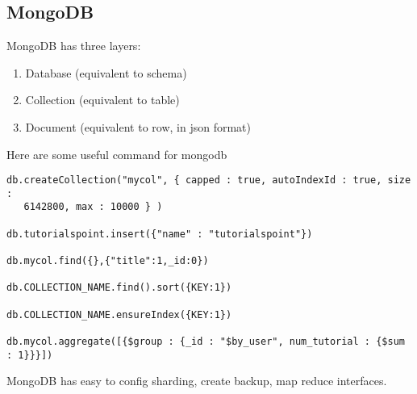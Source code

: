 \subsection{MongoDB}

MongoDB has three layers:
\begin{enumerate}
\item Database (equivalent to schema)
\item Collection (equivalent to table)
\item Document (equivalent to row, in json format)
\end{enumerate}

Here are some useful command for mongodb
\begin{lstlisting}
db.createCollection("mycol", { capped : true, autoIndexId : true, size : 
   6142800, max : 10000 } )
   
db.tutorialspoint.insert({"name" : "tutorialspoint"})

db.mycol.find({},{"title":1,_id:0})

db.COLLECTION_NAME.find().sort({KEY:1})

db.COLLECTION_NAME.ensureIndex({KEY:1})

db.mycol.aggregate([{$group : {_id : "$by_user", num_tutorial : {$sum : 1}}}])
\end{lstlisting}

MongoDB has easy to config sharding, create backup, map reduce interfaces.
